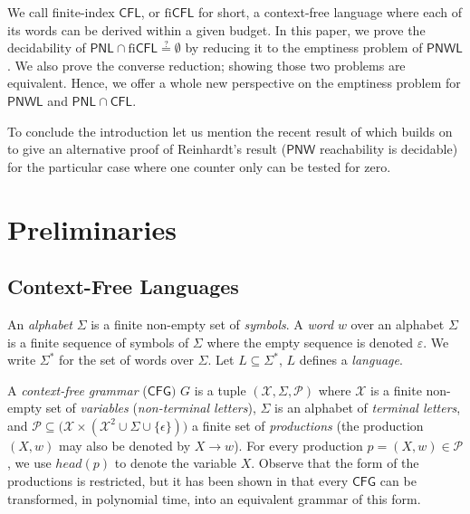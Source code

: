\documentclass{fsttcs}
\def\prod{\mathcal{P}}
\def\cfl{\mathsf{CFL}}
\def\cfg{\mathsf{CFG}}
\def\pnl{\mathsf{PNL}}
\def\pnw{\mathsf{PNW}}
\def\pnwl{\mathsf{PNWL}}
\begin{document}
We call finite-index \(\cfl\), or \(\text{fi}\cfl\) for short, a context-free
language where each of its words can be derived within a given budget.  In this
paper, we prove the decidability of
\(\pnl\cap\text{fi}\cfl\stackrel{?}{=}\emptyset\) by reducing it to the
emptiness problem of \(\pnwl\). We also prove the converse reduction; showing
those two problems are equivalent. Hence, we offer a whole new perspective on
the emptiness problem for \(\pnwl\) and \(\pnl\cap\cfl\).  

To conclude the introduction let us mention the recent result of \cite{RB-mfcs11} which builds on
\cite{LEROUX-POPL2011} to give an alternative proof of Reinhardt's result
(\(\pnw\) reachability is decidable) for the particular case where one counter
only can be tested for zero.















\section{Preliminaries}\label{sec:prelim}

\subsection{Context-Free Languages}

An \emph{alphabet} \(\Sigma\) is a finite non-empty set of \emph{symbols}.
A \emph{word} $w$ over an alphabet \(\Sigma\) is a finite sequence of symbols of
$\Sigma$ where the empty sequence is denoted $\varepsilon$. 
We write $\Sigma^*$ for the set of words over $\Sigma$.
Let $L\subseteq\Sigma^*$, $L$ defines a \emph{language}.  


A \emph{context-free grammar} (\(\cfg)\) $G$ is a tuple
$(\mathcal{X},\Sigma,\prod)$ where $\mathcal{X}$ is a finite non-empty set of \emph{variables}
(\emph{non-terminal letters}), $\Sigma$ is an alphabet of
\emph{terminal letters}, and $\prod \subseteq \big(\mathcal{X}\times (\mathcal{X}^2
\cup \Sigma \cup \{\epsilon\}) \big)$ a finite set of \emph{productions} (the
production $(X,w)$ may also be denoted by $X\rightarrow w$). For every production $p=(X,w) \in \prod$, we use $head(p)$ to denote the variable $X$. Observe that the
form of the productions is restricted, but it has been shown in \cite{LL10} that
every \(\cfg\) can be transformed, in polynomial time, into an equivalent
grammar of this form.
\end{document}
